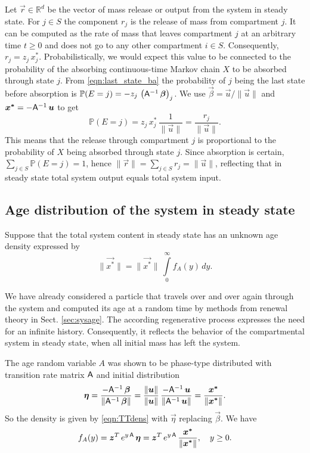 \documentclass[smallextended]{svjour3}
\newcommand{\R}{\mathbb{R}}
\renewcommand{\P}{\mathbb{P}}
\newcommand{\intl}{\int\limits}
\begin{document}
Let $\vec{r}\in \R^d$ be the vector of mass release or output from the system in steady state.
For $j\in S$ the component $r_j$ is the release of mass from compartment $j$.
It can be computed as the rate of mass that leaves compartment $j$ at an arbitrary time $t\geq0$ and does not go to any other compartment $i\in S$.
Consequently, $r_j=z_j\,x_j^\ast$.
Probabilistically, we would expect this value to be connected to the probability of the absorbing continuous-time Markov chain $X$ to be absorbed through state $j$.
From \eqref{eqn:last_state_ba} the probability of $j$ being the last state before absorption is $\P(E=j)=-z_j\,\left(\tens{A}^{-1}\,\vec{\beta}\right)_j$.
We use $\vec{\beta}=\vec{u}/\|\vec{u}\|$ and $\vec{x^\ast}=-\tens{A}^{-1}\,\vec{u}$ to get
\[
    \P(E=j) = z_j\,x_j^\ast\,\frac{1}{\|\vec{u}\|}=\frac{r_j}{\|\vec{u}\|}.
\]
This means that the release through compartment $j$ is proportional to the probability of $X$ being absorbed through state $j$.
Since absorption is certain, $\sum_{j\in S}\P(E=j) = 1$, hence $\|\vec{r}\|=\sum_{j\in S} r_j = \|\vec{u}\|$, reflecting that in steady state total system output equals total system input.

\subsection{Age distribution of the system in steady state}

Suppose that the total system content in steady state has an unknown age density expressed by
\[
    \|\vec{x^\ast}\| = \|\vec{x^\ast}\|\,\intl_0^\infty f_A(y)\,dy.
\]

We have already considered a particle that travels over and over again through the system and computed its age at a random time by methods from renewal theory in Sect. \ref{sec:sysage}.
The according regenerative process expresses the need for an infinite history.
Consequently, it reflects the behavior of the compartmental system in steady state, when all initial mass has left the system.

The age random variable $A$ was shown to be phase-type distributed with transition rate matrix $\mathsf{A}$ and initial distribution
\[
    \vec{\eta}=\frac{-\tens{A}^{-1}\,\vec{\beta}}{\|\tens{A}^{-1}\,\vec{\beta}\|} = \frac{\|\vec{u}\|}{\|\vec{u}\|}\,\frac{-\tens{A}^{-1}\,\vec{u}}{\|\tens{A}^{-1}\,\vec{u}\|} = \frac{\vec{x^\ast}}{\|\vec{x^\ast}\|}.
\]
So the density is given by \eqref{eqn:TTdens} with $\vec{\eta}$ replacing $\vec{\beta}$.
We have
\begin{equation}\label{eqn:SAdens}
    f_A(y)=\vec{z}^T\,e^{y\,\tens{A}}\,\vec{\eta} = \vec{z}^T\,e^{y\,\tens{A}}\,\frac{\vec{x^\ast}}{\|\vec{x^\ast}\|},\quad y\geq0.
\end{equation}
\end{document}
